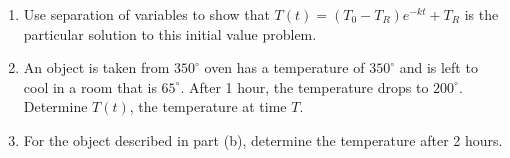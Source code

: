 \documentclass[12pt]{article}
\newif\ifans
\begin{document}
\begin{enumerate}
\begin{enumerate}

\item Use separation of variables to show that $T(t)=(T_0-T_R)e^{-kt}+T_R$ is the particular solution to this initial value problem.

\item An object is taken from $350^{\circ}$ oven has a temperature of $350^{\circ}$ and is left to cool in a room that is $65^{\circ}$.  After 1 hour, the temperature drops to $200^{\circ}$.  Determine $T(t)$, the temperature at time $T$.

\ifans{\fbox{$T(t)=285\left(\frac{9}{19}\right)^t+65$}} \fi

\item For the object described in part (b), determine the temperature after 2 hours.

\ifans{\fbox{$T(2)=\frac{2450}{19}^{\circ}\approx 128.95^{\circ}$}} \fi

\end{enumerate}

\end{enumerate}
\end{document}
